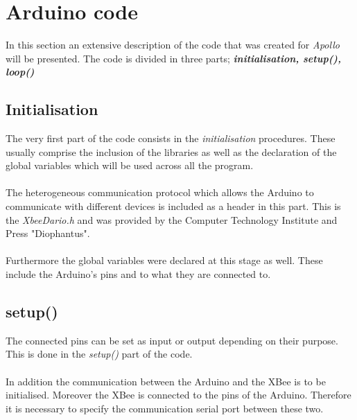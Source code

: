\documentclass[12pt,a4paper]{report}
\begin{document}
\section{Arduino code}
In this section an extensive description of the code that was created for \emph{Apollo} will be presented.
The code is divided in three parts; \textit{\textbf{initialisation, setup(), loop()}}
%
\subsection{Initialisation}
The very first part of the code consists in the \textit{initialisation} procedures.
These usually comprise the inclusion of the libraries as well as the declaration of the global variables which will be used across all the program.\\
\ \\
The heterogeneous communication protocol which allows the Arduino to communicate with different devices is included as a header in this part. This is the \textit{XbeeDario.h} and was provided by the Computer Technology Institute and Press "Diophantus".\\
\ \\
Furthermore the global variables were declared at this stage as well.
These include the Arduino's pins and to what they are connected to. 
%
\subsection{setup()}
The connected pins can be set as input or output depending on their purpose.
This is done in the \textit{setup()} part of the code.\\
\ \\
In addition the communication between the Arduino and the XBee is to be initialised.
Moreover the XBee is connected to the pins of the Arduino.
Therefore it is necessary to specify the communication serial port between these two.
%
\end{document}
